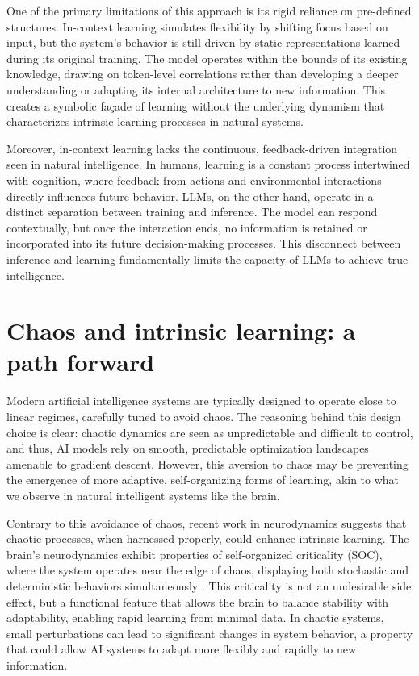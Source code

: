 \documentclass{article}
\begin{document}
One of the primary limitations of this approach is its rigid reliance
on pre-defined structures. In-context learning simulates flexibility
by shifting focus based on input, but the system’s behavior is still
driven by static representations learned during its original training. The
model operates within the bounds of its existing knowledge, drawing on
token-level correlations rather than developing a deeper understanding
or adapting its internal architecture to new information. This creates
a symbolic façade of learning without the underlying dynamism that
characterizes intrinsic learning processes in natural systems.

Moreover, in-context learning lacks the continuous, feedback-driven
integration seen in natural intelligence. In humans, learning is a
constant process intertwined with cognition, where feedback from actions
and environmental interactions directly influences future behavior. LLMs,
on the other hand, operate in a distinct separation between training and
inference. The model can respond contextually, but once the interaction
ends, no information is retained or incorporated into its future
decision-making processes. This disconnect between inference and learning
fundamentally limits the capacity of LLMs to achieve true intelligence.


\section{Chaos and intrinsic learning: a path forward}

Modern artificial intelligence systems are typically designed to
operate close to linear regimes, carefully tuned to avoid chaos. The
reasoning behind this design choice is clear: chaotic dynamics are seen
as unpredictable and difficult to control, and thus, AI models rely
on smooth, predictable optimization landscapes amenable to
gradient descent. However, this aversion to chaos may be preventing the
emergence of more adaptive, self-organizing forms of learning, akin to
what we observe in natural intelligent systems like the brain.

Contrary to this avoidance of chaos, recent work in neurodynamics suggests
that chaotic processes, when harnessed properly, could enhance intrinsic
learning. The brain's neurodynamics exhibit properties of self-organized
criticality (SOC), where the system operates near the edge of chaos,
displaying both stochastic and deterministic behaviors simultaneously
\cite{Habibollahi2023,ovchinnikov2021,Ovchinnikov_2016}. This criticality is not an undesirable side
effect, but a functional feature that allows the brain to balance
stability with adaptability, enabling rapid learning from minimal data. In
chaotic systems, small perturbations can lead to significant changes in
system behavior, a property that could allow AI systems to adapt more
flexibly and rapidly to new information.
\end{document}
